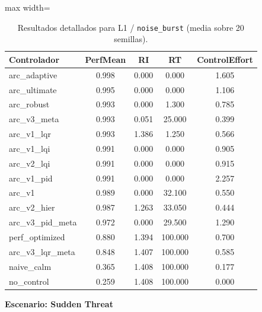 \documentclass{article}
\newcommand{\scenarioheader}[1]{\Needspace{20\baselineskip}\textbf{Escenario: #1}}
\begin{document}
\begin{table}[H]
\centering
\footnotesize
\caption{Resultados detallados para L1 / \texttt{noise\_burst} (media sobre 20 semillas).}
\label{tab:g2_noise_burst}
\begin{adjustbox}{max width=\textwidth}
\begin{tabular}{@{}lcccc@{}}
\toprule
Controlador & PerfMean & RI & RT & ControlEffort \\ \midrule
arc\_adaptive & 0.998 & 0.000 & 0.000 & 1.605 \\
arc\_ultimate & 0.995 & 0.000 & 0.000 & 1.106 \\
arc\_robust & 0.993 & 0.000 & 1.300 & 0.785 \\
arc\_v3\_meta & 0.993 & 0.051 & 25.000 & 0.399 \\
arc\_v1\_lqr & 0.993 & 1.386 & 1.250 & 0.566 \\
arc\_v1\_lqi & 0.991 & 0.000 & 0.000 & 0.905 \\
arc\_v2\_lqi & 0.991 & 0.000 & 0.000 & 0.915 \\
arc\_v1\_pid & 0.991 & 0.000 & 0.000 & 2.257 \\
arc\_v1 & 0.989 & 0.000 & 32.100 & 0.550 \\
arc\_v2\_hier & 0.987 & 1.263 & 33.050 & 0.444 \\
arc\_v3\_pid\_meta & 0.972 & 0.000 & 29.500 & 1.290 \\
perf\_optimized & 0.880 & 1.394 & 100.000 & 0.700 \\
arc\_v3\_lqr\_meta & 0.848 & 1.407 & 100.000 & 0.585 \\
naive\_calm & 0.365 & 1.408 & 100.000 & 0.177 \\
no\_control & 0.259 & 1.408 & 100.000 & 0.000 \\ \bottomrule
\end{tabular}
\end{adjustbox}
\end{table}

\scenarioheader{Sudden Threat}
\end{document}
